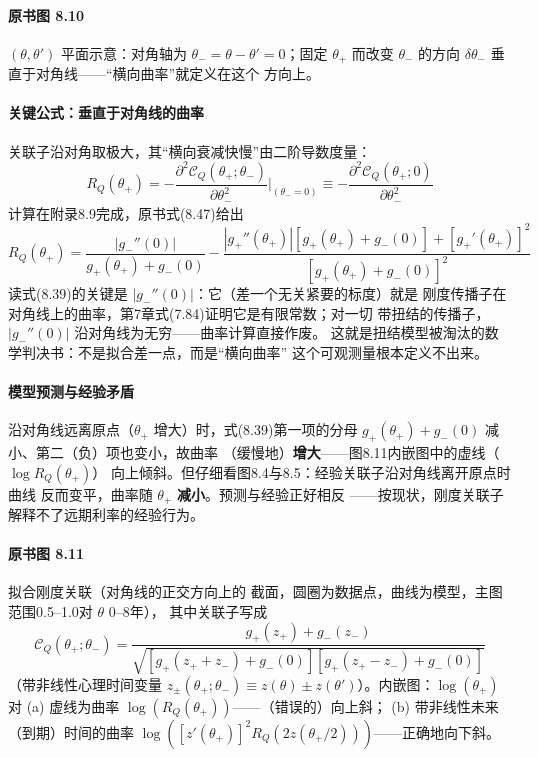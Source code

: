 \paragraph{原书图 8.10}\quad $(\theta,\theta')$ 平面示意：对角轴为
$\theta_{-}=\theta-\theta'=0$；固定 $\theta_{+}$ 而改变 $\theta_{-}$
的方向 $\delta\theta_{-}$ 垂直于对角线——“横向曲率”就定义在这个
方向上。

\paragraph{关键公式：垂直于对角线的曲率}
关联子沿对角取极大，其“横向衰减快慢”由二阶导数度量：
\begin{equation*}
R_{Q}(\theta_{+})=-\frac{\partial^{2}\mathcal{C}_{Q}(\theta_{+};\theta_{-})}
{\partial\theta_{-}^{2}}\bigg|_{(\theta_{-}=0)}
\equiv-\frac{\partial^{2}\mathcal{C}_{Q}(\theta_{+};0)}{\partial\theta_{-}^{2}}
\tag{8.38}
\end{equation*}
计算在附录8.9完成，原书式(8.47)给出
\begin{equation*}
R_{Q}(\theta_{+})=\frac{|g_{-}''(0)|}{g_{+}(\theta_{+})+g_{-}(0)}
-\frac{|g_{+}''(\theta_{+})|\left[g_{+}(\theta_{+})+g_{-}(0)\right]
+\left[g_{+}'(\theta_{+})\right]^{2}}
{\left[g_{+}(\theta_{+})+g_{-}(0)\right]^{2}}
\tag{8.39}
\end{equation*}
读式(8.39)的关键是 $|g_{-}''(0)|$：它（差一个无关紧要的标度）就是
刚度传播子在对角线上的曲率，第7章式(7.84)证明它是有限常数；对一切
带扭结的传播子，$|g_{-}''(0)|$ 沿对角线为无穷——曲率计算直接作废。
这就是扭结模型被淘汰的数学判决书：不是拟合差一点，而是“横向曲率”
这个可观测量根本定义不出来。

\paragraph{模型预测与经验矛盾}
沿对角线远离原点（$\theta_{+}$ 增大）时，式(8.39)第一项的分母
$g_{+}(\theta_{+})+g_{-}(0)$ 减小、第二（负）项也变小，故曲率
（缓慢地）\textbf{增大}——图8.11内嵌图中的虚线（$\log R_{Q}(\theta_{+})$）
向上倾斜。但仔细看图8.4与8.5：经验关联子沿对角线离开原点时曲线
反而变平，曲率随 $\theta_{+}$ \textbf{减小}。预测与经验正好相反
——按现状，刚度关联子解释不了远期利率的经验行为。
\paragraph{原书图 8.11}\quad 拟合刚度关联（对角线的正交方向上的
截面，圆圈为数据点，曲线为模型，主图范围0.5--1.0对 $\theta$ 0--8年），
其中关联子写成
\begin{equation*}
\mathcal{C}_{Q}(\theta_{+};\theta_{-})=
\frac{g_{+}(z_{+})+g_{-}(z_{-})}
{\sqrt{\left[g_{+}(z_{+}+z_{-})+g_{-}(0)\right]
\left[g_{+}(z_{+}-z_{-})+g_{-}(0)\right]}}
\end{equation*}
（带非线性心理时间变量 $z_{\pm}(\theta_{+};\theta_{-})\equiv
z(\theta)\pm z(\theta')$）。内嵌图：$\log(\theta_{+})$ 对
(a) 虚线为曲率 $\log(R_{Q}(\theta_{+}))$——（错误的）向上斜；
(b) 带非线性未来（到期）时间的曲率
$\log([z'(\theta_{+})]^{2}R_{Q}(2z(\theta_{+}/2)))$——正确地向下斜。

